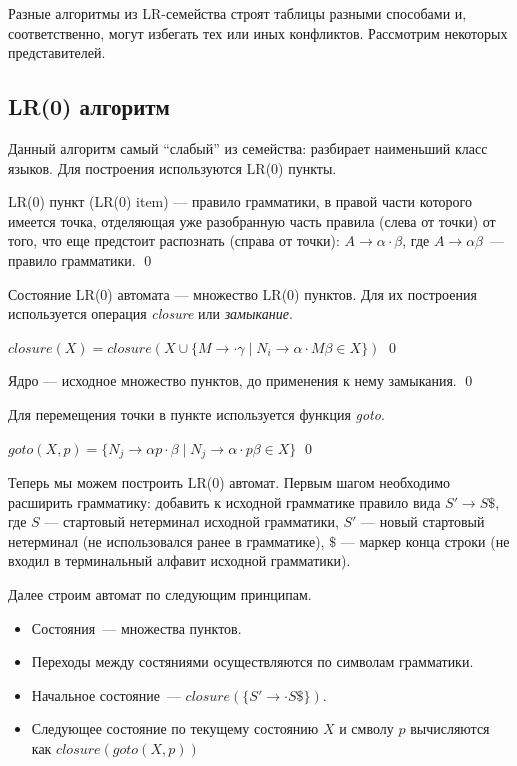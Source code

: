Разные алгоритмы из LR-семейства строят таблицы разными способами и, соответственно, могут избегать тех или иных конфликтов. Рассмотрим некоторых представителей.

\subsection{LR(0) алгоритм}

Данный алгоритм самый ``слабый'' из семейства: разбирает наименьший класс языков.
Для построения используются LR(0) пункты.

\begin{definition}
LR(0) пункт (LR(0) item) --- правило грамматики, в правой части которого имеется точка, отделяющая уже разобранную часть правила (слева от точки) от того, что еще предстоит распознать (справа от точки): $A \to \alpha \cdot \beta$, где $A \to \alpha \beta$~--- правило грамматики.
\qed
\end{definition}

Состояние LR(0) автомата --- множество LR(0) пунктов. Для их построения используется операция \textit{closure} или \textit{замыкание}.

\begin{definition}
$closure(X)  = closure(X \cup \{M \rightarrow \cdot \gamma \mid N_i \rightarrow \alpha\cdot M\beta \in X \})$
\qed
\end{definition}

\begin{definition}
Ядро --- исходное множество пунктов, до применения к нему замыкания.
\qed
\end{definition}

Для перемещения точки в пункте используется функция \textit{goto}.

\begin{definition}
$goto(X,p)  = \{N_j \rightarrow \alpha p \cdot \beta \mid N_j \rightarrow \alpha\cdot p\beta \in X \}$
\qed
\end{definition}

Теперь мы можем построить LR(0) автомат.
Первым шагом необходимо расширить грамматику: добавить к исходной грамматике правило вида $S' \to S \$$, где $S$ --- стартовый нетерминал исходной грамматики, $S'$ --- новый стартовый нетерминал (не использовался ранее в грамматике), $\$$ --- маркер конца строки (не входил в терминальный алфавит исходной грамматики).

Далее строим автомат по следующим принципам.

\begin{itemize}
    \item Состояния~--- множества пунктов.
    \item Переходы между состяниями осуществляются по символам грамматики.
    \item Начальное состояние~--- $closure(\{S'\to
    \cdot S \$\})$.
    \item Следующее состояние по текущему состоянию $X$ и смволу $p$ вычисляются как $closure(goto(X, p))$
  \end{itemize}

